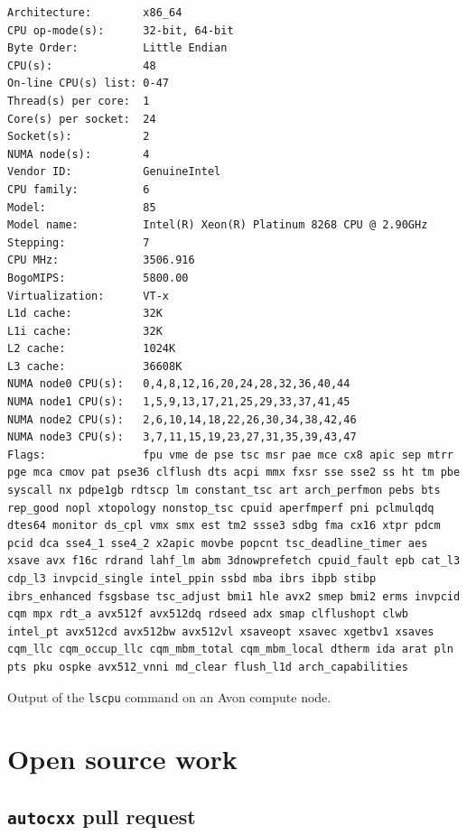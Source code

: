 \begin{code}
    \begin{verbatim}
Architecture:        x86_64
CPU op-mode(s):      32-bit, 64-bit
Byte Order:          Little Endian
CPU(s):              48
On-line CPU(s) list: 0-47
Thread(s) per core:  1
Core(s) per socket:  24
Socket(s):           2
NUMA node(s):        4
Vendor ID:           GenuineIntel
CPU family:          6
Model:               85
Model name:          Intel(R) Xeon(R) Platinum 8268 CPU @ 2.90GHz
Stepping:            7
CPU MHz:             3506.916
BogoMIPS:            5800.00
Virtualization:      VT-x
L1d cache:           32K
L1i cache:           32K
L2 cache:            1024K
L3 cache:            36608K
NUMA node0 CPU(s):   0,4,8,12,16,20,24,28,32,36,40,44
NUMA node1 CPU(s):   1,5,9,13,17,21,25,29,33,37,41,45
NUMA node2 CPU(s):   2,6,10,14,18,22,26,30,34,38,42,46
NUMA node3 CPU(s):   3,7,11,15,19,23,27,31,35,39,43,47
Flags:               fpu vme de pse tsc msr pae mce cx8 apic sep mtrr pge mca cmov pat pse36 clflush dts acpi mmx fxsr sse sse2 ss ht tm pbe syscall nx pdpe1gb rdtscp lm constant_tsc art arch_perfmon pebs bts rep_good nopl xtopology nonstop_tsc cpuid aperfmperf pni pclmulqdq dtes64 monitor ds_cpl vmx smx est tm2 ssse3 sdbg fma cx16 xtpr pdcm pcid dca sse4_1 sse4_2 x2apic movbe popcnt tsc_deadline_timer aes xsave avx f16c rdrand lahf_lm abm 3dnowprefetch cpuid_fault epb cat_l3 cdp_l3 invpcid_single intel_ppin ssbd mba ibrs ibpb stibp ibrs_enhanced fsgsbase tsc_adjust bmi1 hle avx2 smep bmi2 erms invpcid cqm mpx rdt_a avx512f avx512dq rdseed adx smap clflushopt clwb intel_pt avx512cd avx512bw avx512vl xsaveopt xsavec xgetbv1 xsaves cqm_llc cqm_occup_llc cqm_mbm_total cqm_mbm_local dtherm ida arat pln pts pku ospke avx512_vnni md_clear flush_l1d arch_capabilities
    \end{verbatim}
    \caption{Output of the \texttt{lscpu} command on an Avon compute node.}
    \label{listing:avon-lscpu}
\end{code}

\chapter{Open source work}
\label{ch:open-source-appendix}

\newpage

\section{\texttt{autocxx} pull request}
\label{sec:autocxx-pull-request-appendix}

